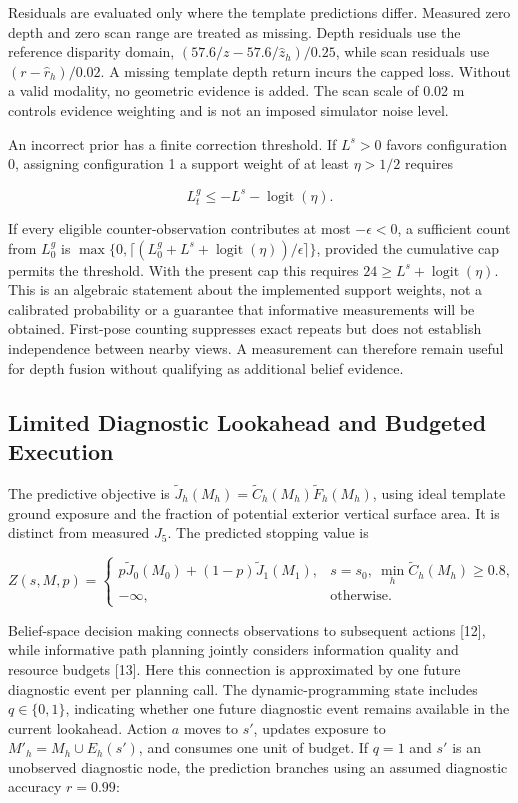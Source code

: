 \documentclass[11pt,a4paper]{article}
\begin{document}
Residuals are evaluated only where the template predictions differ. Measured zero depth and zero scan range are treated as missing. Depth residuals use the reference disparity domain, \((57.6/z-57.6/\widehat z_h)/0.25\), while scan residuals use \((r-\widehat r_h)/0.02\). A missing template depth return incurs the capped loss. Without a valid modality, no geometric evidence is added. The scan scale of 0.02 m controls evidence weighting and is not an imposed simulator noise level.

An incorrect prior has a finite correction threshold. If \(L^s>0\) favors configuration 0, assigning configuration 1 a support weight of at least \(\eta>1/2\) requires

\[
L_t^g\le-L^s-\operatorname{logit}(\eta).
\]

If every eligible counter-observation contributes at most \(-\epsilon<0\), a sufficient count from \(L_0^g\) is \(\max\{0,\lceil(L_0^g+L^s+\operatorname{logit}(\eta))/\epsilon\rceil\}\), provided the cumulative cap permits the threshold. With the present cap this requires \(24\ge L^s+\operatorname{logit}(\eta)\). This is an algebraic statement about the implemented support weights, not a calibrated probability or a guarantee that informative measurements will be obtained. First-pose counting suppresses exact repeats but does not establish independence between nearby views. A measurement can therefore remain useful for depth fusion without qualifying as additional belief evidence.

\hypertarget{limited-diagnostic-lookahead-and-budgeted-execution}{%
\subsection{Limited Diagnostic Lookahead and Budgeted Execution}\label{limited-diagnostic-lookahead-and-budgeted-execution}}

The predictive objective is \(\widetilde J_h(M_h)=\widetilde C_h(M_h)\widetilde F_h(M_h)\), using ideal template ground exposure and the fraction of potential exterior vertical surface area. It is distinct from measured \(J_5\). The predicted stopping value is

\[
Z(s,M,p)=
\begin{cases}
p\widetilde J_0(M_0)+(1-p)\widetilde J_1(M_1),
&s=s_0,\ \min_h\widetilde C_h(M_h)\ge0.8,\\
-\infty,&\text{otherwise}.
\end{cases}
\]

Belief-space decision making connects observations to subsequent actions {[}12{]}, while informative path planning jointly considers information quality and resource budgets {[}13{]}. Here this connection is approximated by one future diagnostic event per planning call. The dynamic-programming state includes \(q\in\{0,1\}\), indicating whether one future diagnostic event remains available in the current lookahead. Action \(a\) moves to \(s'\), updates exposure to \(M'_h=M_h\cup E_h(s')\), and consumes one unit of budget. If \(q=1\) and \(s'\) is an unobserved diagnostic node, the prediction branches using an assumed diagnostic accuracy \(r=0.99\):
\end{document}
